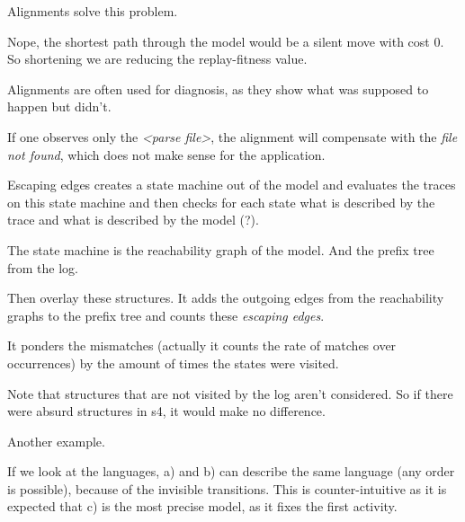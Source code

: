 \nextslides

\nextslides[slide=60,until=63,highlight=63]

\nextslides[slide=,until=65,highlight=]

Alignments solve this problem.

\nextslides[slide=72,until=,highlight=]

Nope, the shortest path through the model would be a silent move with cost 0. So shortening we are reducing the replay-fitness value.

\nextslides[slide=,until=74,highlight=74]

Alignments are often used for diagnosis, as they show what was supposed to happen but didn't.

If one observes only the \emph{<parse file>}, the alignment will compensate with the \emph{file not found}, which does not make sense for the application.

\nextslides[slide=78,until=,highlight=]

\nextslides

Escaping edges creates a state machine out of the model and evaluates the traces on this state machine and then checks for each state what is described by the trace and what is described by the model (?).

\nextslides[slide=,until=81,highlight=81]

\nextslides[slide=,until=89,highlight=89]

The state machine is the reachability graph of the model. And the prefix tree from the log.

Then overlay these structures. It adds the outgoing edges from the reachability graphs to the prefix tree and counts these \emph{escaping edges}.

\nextslides

It ponders the mismatches (actually it counts the rate of matches over occurrences) by the amount of times the states were visited.

Note that structures that are not visited by the log aren't considered. So if there were absurd structures in s4, it would make no difference.

\nextslides

Another example.

\nextslides[slide=95,until=98,highlight=98]

If we look at the languages, a) and b) can describe the same language (any order is possible), because of the invisible transitions. This is counter-intuitive as it is expected that c) is the most precise model, as it fixes the first activity.

